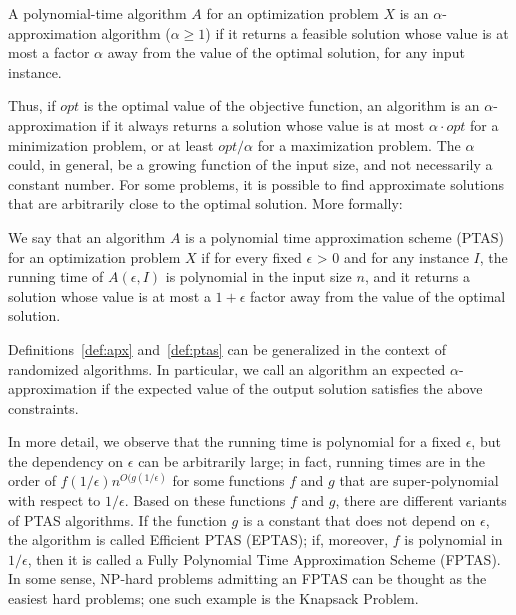 \begin{definition}
 A polynomial-time algorithm $A$ for an optimization problem $X$
is an $\alpha$-approximation algorithm ($\alpha \ge 1$) if it returns a feasible solution whose value is
at most a factor $\alpha$ away from the value of the optimal solution, for any input
instance.
\label{def:apx}
\end{definition}

Thus, if $opt$ is the optimal value of the objective function, an algorithm is an $\alpha$-approximation if it always returns a
solution whose value is at most $\alpha \cdot opt$ for a minimization problem, or at least
$opt/\alpha$ for a maximization problem.
The $\alpha$ could, in general, be a growing function of the input size, and
not necessarily a constant number.
For some problems, it is possible to find approximate solutions that are
arbitrarily close to the optimal solution. More formally:

\begin{definition}
 We say that an algorithm $A$ is a polynomial time approximation
scheme (PTAS) for an optimization problem $X$ if for every fixed $\epsilon$ > 0 and for
any instance $I$, the running time of $A(\epsilon, I)$ is polynomial in the input size $n$,
and it returns a solution whose value is at most a $1 + \epsilon$ factor away from the
value of the optimal solution.
\label{def:ptas}
\end{definition}


Definitions~\ref{def:apx} and~\ref{def:ptas} can be generalized in the context of randomized algorithms.
In particular, we call an algorithm an expected
$\alpha$-approximation if the expected value of the output solution satisfies the above
constraints.

In more detail, we observe that the running time is polynomial for a fixed $\epsilon$, but the dependency
on $\epsilon$ can be arbitrarily large; in fact, running times are in the order of $f(1/\epsilon)n ^{O(g(1/\epsilon)}$ for some functions $f$ and $g$ that are super-polynomial with
respect to $1/\epsilon$. Based on these functions $f$ and $g$, there are different variants of PTAS algorithms.
If the function $g$ is a constant that does not depend
on $\epsilon$, the algorithm is called Efficient PTAS (EPTAS); if, moreover, $f$
is polynomial in $1/\epsilon$, then it is called a Fully Polynomial Time Approximation
Scheme (FPTAS). In some sense, NP-hard problems admitting an FPTAS can
be thought as the easiest hard problems; one such example is the Knapsack
Problem.

